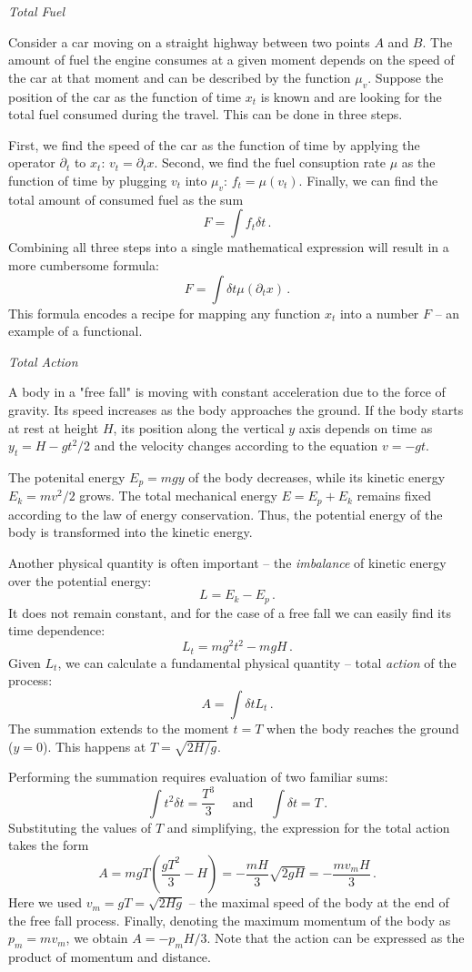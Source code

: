 \begin{flushleft}
	{\it Total Fuel}
\end{flushleft}
Consider a car moving on a straight highway between two points $A$ and $B$. The amount of fuel the engine consumes at a given moment depends on the speed of the car at that moment and can be described by the function $\mu_v$. Suppose the position of the car as the function of time $x_t$ is known and are looking for the total fuel consumed during the travel. This can be done in three steps. 

First, we find the speed of the car as the function of time by applying the operator $\partial_t$ to $x_t$: $v_t=\partial_{t}x$. Second, we find the fuel consuption rate $\mu$  as the function of time by plugging $v_t$ into $\mu_v$: $f_t = \mu(v_t)$. Finally, we can find the total amount of consumed fuel as the sum
\[
F = \int f_t\delta t\,.
\]
Combining all three steps into a single mathematical expression will result in a more cumbersome formula:
\[
F = \int \delta t\mu(\partial_t x)\,.
\]
This formula encodes a recipe for mapping any function $x_t$ into a number $F$ -- an example of a functional.

\begin{flushleft}
	{\it Total Action}
\end{flushleft}
A body in a "free fall" is moving with constant acceleration due to the force of gravity. Its speed increases as the body approaches the ground. If the body starts at rest at height $H$, its position along the vertical $y$ axis depends on time as $y_t=H-gt^2/2$ and the velocity changes according to the equation $v=-gt$.

The potenital energy $E_p=mgy$ of the body decreases, while its kinetic energy $E_k=mv^2/2$ grows. The total mechanical energy $E=E_p+E_k$ remains fixed according to the law of energy conservation. Thus, the potential energy of the body is transformed into the kinetic energy.

Another physical quantity is often important -- the \emph{imbalance} of kinetic energy over the potential energy:
\[
L = E_k - E_p\,.
\]
It does not remain constant, and for the case of a free fall we can easily find its time dependence:
\[
L_t = mg^2t^2 - mgH\,.
\]
Given $L_t$, we can calculate a fundamental physical quantity -- total \emph{action} of the process:
\[
A = \int\delta t L_t\,.
\]
The summation extends to the moment $t=T$ when the body reaches the ground ($y=0$). This happens at $T=\sqrt{2H/g}$.

Performing the summation requires evaluation of two familiar sums:
\[
\int t^2\delta t =\frac{T^3}{3}\quad\textrm{ and }\quad \int \delta t=T\,.
\]
Substituting the values of $T$ and simplifying, the expression for the total action takes the form
\[
A = mgT(\frac{gT^2}{3}-H)=-\frac{mH}{3}\sqrt{2gH}=-\frac{mv_{m}H}{3}\,.
\]
Here we used $v_m=gT=\sqrt{2Hg}$ -- the maximal speed of the body at the end of the free fall process. Finally, denoting the maximum momentum of the body as $p_m=mv_m$, we obtain $A=-p_m H/3$. Note that the action can be expressed as the product of momentum and distance.

